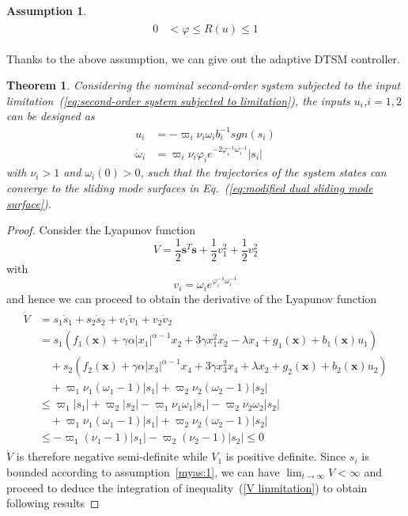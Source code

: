 \documentclass[3p]{elsarticle}
\theoremstyle{plain}
\newtheorem{myas}{Assumption}
\newtheorem{mythm}{Theorem}
\theoremstyle{remark}
\begin{document}
{\begin{myas}
\begin{align}
\begin{split}
  0&<\varphi\le R(u) \le 1
\end{split}\end{align}
\end{myas}
Thanks to the above assumption, we can give out the adaptive DTSM controller.
\begin{mythm}\label{thm:4}
Considering the nominal second-order system subjected to the input limitation~(\ref{eq:second-order system subjected to limitation}), the inputs $u_i$,$i=1,2$ can be designed as
\begin{align}
  u_i &= -\varpi_i\nu_i\omega_i b_i^{-1}sgn(s_i)\\
  \dot\omega_i&= \varpi_i\nu_i\varphi_i e^{-2\varphi_i^{-1}\omega_i^{-1}}\vert s_i\vert
\end{align}
with $\nu_i>1$ and $\omega_i(0)>0$, such that the trajectories of the system states can converge to the sliding mode  surfaces in Eq.~(\ref{eq:modified dual sliding mode  surface}).
\end{mythm}
\begin{proof}
Consider the Lyapunov function
$$V=\frac{1}{2}\bm s^T\bm s+\frac{1}{2}v_1^2+\frac{1}{2}v_2^2$$
with
$$v_i = \omega_ie^{\varphi_i^{-1}\omega_i^{-1}}$$
and hence we can proceed to obtain the derivative of the Lyapunov function
\begin{align}\begin{split}
\dot V &=s_1\dot s_1+s_2\dot s_2+v_1\dot v_1+v_2\dot v_2\\
&=s_1(f_1(\bm x)+\gamma\alpha\vert x_1\vert^{\alpha-1}x_2+3\gamma x_1^2x_2-\lambda x_4+g_1(\bm x)+b_1(\bm x)u_1)\\
&\quad +s_2(f_2(\bm x)+\gamma\alpha\vert x_3\vert^{\alpha-1}x_4+3\gamma x_3^2x_4+\lambda x_2+g_2(\bm x)+b_2(\bm x)u_2)\\
&\quad+\varpi_1\nu_1(\omega_1-1)\vert s_1\vert+\varpi_2\nu_2(\omega_2-1)\vert s_2\vert\\
&\le \varpi_1\vert s_1\vert+\varpi_2\vert s_2\vert-\varpi_1\nu_1\omega_1\vert s_1\vert-\varpi_2\nu_2\omega_2\vert s_2\vert\\
&\quad + \varpi_1\nu_1(\omega_1-1)\vert s_1\vert+\varpi_2\nu_2(\omega_2-1)\vert s_2\vert\\
&\le -\varpi_1(\nu_1-1)\vert s_1\vert-\varpi_2(\nu_2-1)\vert s_2\vert\le 0\label{V linmitation}
\end{split}\end{align}
$\dot V$ is therefore negative semi-deﬁnite while $V_1$ is positive deﬁnite. Since  $s_i$ is bounded according to assumption~\ref{myas:1}, we can have $\lim_{t\to\infty}V<\infty$ and proceed to deduce the integration of inequality~(\ref{V linmitation}) to obtain following results

\end{proof}}
\end{document}
